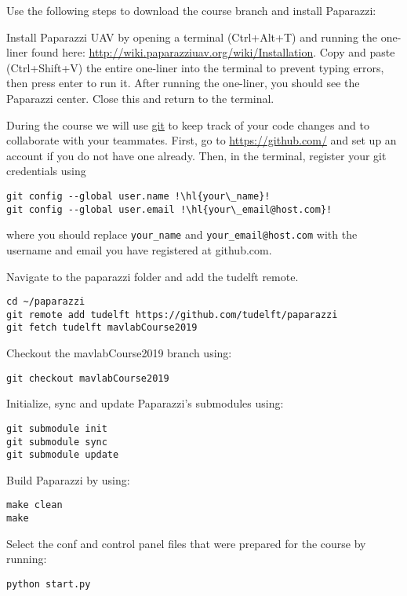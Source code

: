 \documentclass{article}
\begin{document}
Use the following steps to download the course branch and install Paparazzi:
\begin{enumerate}
\item{Install Paparazzi UAV by opening a terminal (Ctrl+Alt+T) and running the one-liner found here: \url{http://wiki.paparazziuav.org/wiki/Installation}. Copy and paste (Ctrl+Shift+V) the entire one-liner into the terminal to prevent typing errors, then press enter to run it. After running the one-liner, you should see the Paparazzi center. Close this and return to the terminal.}
\item{During the course we will use \href{https://git-scm.com/}{git} to keep track of your code changes and to collaborate with your teammates. First, go to \url{https://github.com/} and set up an account if you do not have one already. Then, in the terminal, register your git credentials using
\begin{lstlisting}[style=Bash]
git config --global user.name !\hl{your\_name}!
git config --global user.email !\hl{your\_email@host.com}!
\end{lstlisting}
where you should replace \texttt{your\_name} and \texttt{your\_email@host.com} with the username and email you have registered at github.com.}
\item{Navigate to the paparazzi folder and add the tudelft remote.
\begin{lstlisting}[style=Bash]
cd ~/paparazzi
git remote add tudelft https://github.com/tudelft/paparazzi
git fetch tudelft mavlabCourse2019
\end{lstlisting}
}
\item{Checkout the mavlabCourse2019 branch using:
\begin{lstlisting}[style=Bash]
git checkout mavlabCourse2019
\end{lstlisting}
}
\item{Initialize, sync and update Paparazzi's submodules using:
\begin{lstlisting}[style=Bash]
git submodule init
git submodule sync
git submodule update
\end{lstlisting}
}
\item{Build Paparazzi by using:
\begin{lstlisting}[style=Bash]
make clean
make
\end{lstlisting}
\item{Select the conf and control panel files that were prepared for the course by running:
\begin{lstlisting}[style=Bash]
python start.py
\end{lstlisting}
}}
\end{enumerate}
\end{document}
